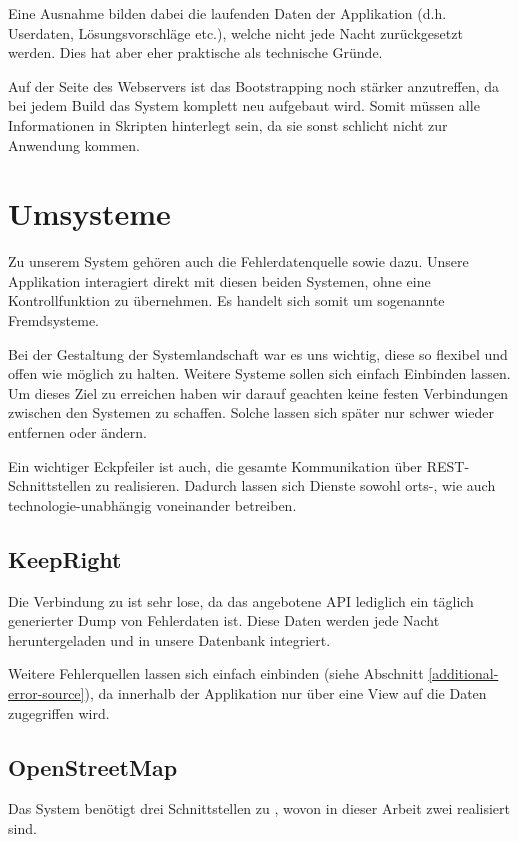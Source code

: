 Eine Ausnahme bilden dabei die laufenden Daten der Applikation (d.h. Userdaten, Lösungsvorschläge etc.), welche nicht jede Nacht zurückgesetzt werden.
Dies hat aber eher praktische als technische Gründe.

Auf der Seite des Webservers ist das \gls{Bootstrapping} noch stärker anzutreffen, da bei jedem Build das System komplett neu aufgebaut wird.
Somit müssen alle Informationen in Skripten hinterlegt sein, da sie sonst schlicht nicht zur Anwendung kommen.

\section{Umsysteme}
Zu unserem System gehören auch die Fehlerdatenquelle  sowie  dazu.
Unsere Applikation interagiert direkt mit diesen beiden Systemen, ohne eine Kontrollfunktion zu übernehmen.
Es handelt sich somit um sogenannte Fremdsysteme.

Bei der Gestaltung der Systemlandschaft war es uns wichtig, diese so flexibel und offen wie möglich zu halten.
Weitere Systeme sollen sich einfach Einbinden lassen.
Um dieses Ziel zu erreichen haben wir darauf geachten keine festen Verbindungen zwischen den Systemen zu schaffen.
Solche lassen sich später nur schwer wieder entfernen oder ändern.

Ein wichtiger Eckpfeiler ist auch, die gesamte Kommunikation über \gls{REST}-Schnittstellen zu realisieren.
Dadurch lassen sich Dienste sowohl orts-, wie auch technologie-unabhängig voneinander betreiben.

\subsection{KeepRight}
Die Verbindung zu  ist sehr lose, da das angebotene \gls{API} lediglich ein täglich generierter Dump von Fehlerdaten ist.
Diese Daten werden jede Nacht heruntergeladen und in unsere Datenbank integriert.

Weitere Fehlerquellen lassen sich einfach einbinden (siehe Abschnitt \ref{additional-error-source}), da innerhalb der Applikation nur über eine View auf die Daten zugegriffen wird.

\subsection{OpenStreetMap}
Das System benötigt drei Schnittstellen zu , wovon in dieser Arbeit zwei realisiert sind.

